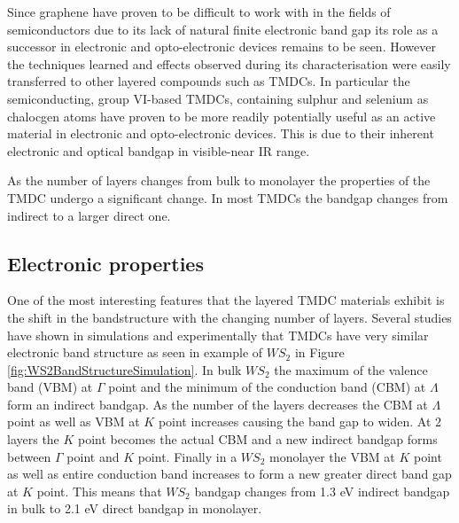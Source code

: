 \documentclass[12pt]{article}
\begin{document}
	Since graphene have proven to be difficult to work with in the fields of semiconductors due to its lack of natural finite electronic band gap its role as a successor in electronic and opto-electronic devices remains to be seen. However the techniques learned and effects observed during its characterisation were easily transferred to other layered compounds such as TMDCs. In particular the semiconducting, group VI-based TMDCs, containing sulphur and selenium as chalocgen atoms have proven to be more readily potentially useful as an active material in electronic and opto-electronic devices. This is due to their inherent electronic and optical bandgap in visible-near IR range. 
	
	As the number of layers changes from bulk to monolayer the properties of the TMDC undergo a significant change. In most TMDCs the bandgap changes from indirect to a larger direct one. 
	
	\subsection{Electronic properties}
	\label{subsec:Electronic properties}
	
	One of the most interesting features that the layered TMDC materials exhibit is the shift in the bandstructure with the changing number of layers. Several studies have shown in simulations and experimentally that TMDCs have very similar electronic band structure as seen in example of $WS_2$ in Figure \ref{fig:WS2BandStructureSimulation}. In bulk $WS_2$ the maximum of the valence band (VBM) at $\Gamma$ point and the minimum of the conduction band (CBM) at $\Lambda$ form an indirect bandgap. As the number of the layers decreases the CBM at $\Lambda$ point as well as VBM at $K$ point increases causing the band gap to widen. At 2 layers the $K$ point becomes the actual CBM and a new indirect bandgap forms between $\Gamma$ point and $K$ point. Finally in a $WS_2$ monolayer the VBM at $K$ point as well as entire conduction band increases to form a new greater direct band gap at $K$ point. This means that $WS_2$ bandgap changes from 1.3 eV indirect bandgap in bulk to 2.1 eV direct bandgap in monolayer.
	
\end{document}
